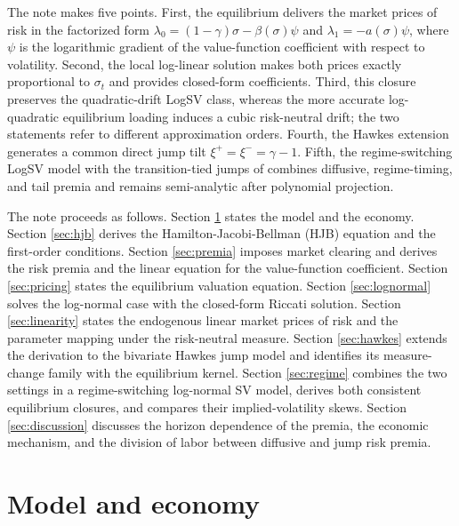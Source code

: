 \documentclass[11pt]{article}
\theoremstyle{remark}
\begin{document}
The note makes five points. First, the equilibrium delivers the market prices of risk in the factorized form $\lambda_{0}=(1-\gamma)\sigma-\beta(\sigma)\psi$ and $\lambda_{1}=-a(\sigma)\psi$, where $\psi$ is the logarithmic gradient of the value-function coefficient with respect to volatility. Second, the local log-linear solution makes both prices exactly proportional to $\sigma_{t}$ and provides closed-form coefficients. Third, this closure preserves the quadratic-drift LogSV class, whereas the more accurate log-quadratic equilibrium loading induces a cubic risk-neutral drift; the two statements refer to different approximation orders. Fourth, the Hawkes extension generates a common direct jump tilt $\xi^{+}=\xi^{-}=\gamma-1$. Fifth, the regime-switching LogSV model with the transition-tied jumps of \cite{Sepp2026gba} combines diffusive, regime-timing, and tail premia and remains semi-analytic after polynomial projection.

The note proceeds as follows. Section \ref{sec:model} states the model and the economy. Section \ref{sec:hjb} derives the Hamilton-Jacobi-Bellman (HJB) equation and the first-order conditions. Section \ref{sec:premia} imposes market clearing and derives the risk premia and the linear equation for the value-function coefficient. Section \ref{sec:pricing} states the equilibrium valuation equation. Section \ref{sec:lognormal} solves the log-normal case with the closed-form Riccati solution. Section \ref{sec:linearity} states the endogenous linear market prices of risk and the parameter mapping under the risk-neutral measure. Section \ref{sec:hawkes} extends the derivation to the bivariate Hawkes jump model and identifies its measure-change family with the equilibrium kernel. Section \ref{sec:regime} combines the two settings in a regime-switching log-normal SV model, derives both consistent equilibrium closures, and compares their implied-volatility skews. Section \ref{sec:discussion} discusses the horizon dependence of the premia, the economic mechanism, and the division of labor between diffusive and jump risk premia.

\section{Model and economy}\label{sec:model}
\end{document}
